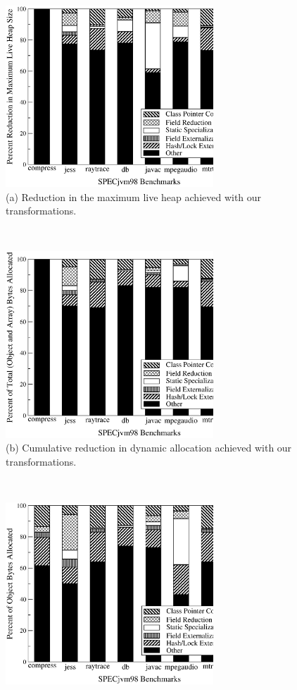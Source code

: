 \documentclass{sig-alt-full}
\begin{document}
\begin{figure}
\begin{center}%
\parbox[b]{8cm}{\centering%
\includegraphics[width=7.8cm,clip=true]{Figures/sas-ttllive.eps}\\
(a) Reduction in the maximum live heap achieved with our transformations.}%
~~\parbox[b]{8cm}{\centering%
\includegraphics[width=7.8cm,clip=true]{Figures/sas-ttlalloc.eps}\\
(b) Cumulative reduction in dynamic allocation achieved with
    our transformations.
}%
\\[.3cm]
\parbox[b]{8cm}{\centering%
\includegraphics[width=7.8cm,clip=true]{Figures/sas-objalloc.eps}\\
}
\end{center}
\end{figure}
\end{document}

